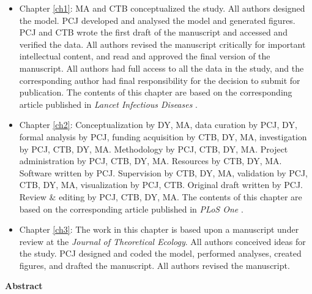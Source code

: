   \begin{itemize}
    
   \item Chapter \ref{ch1}: MA and CTB conceptualized the study. All authors designed the model. PCJ developed and analysed the model and generated figures. PCJ and CTB wrote the first draft of the manuscript and accessed and verified the data. All authors revised the manuscript critically for important intellectual content, and read and approved the final version of the manuscript. All authors had full access to all the data in the study, and the corresponding author had final responsibility for the decision to submit for publication. The contents of this chapter are based on the corresponding article published in \textit{Lancet Infectious Diseases} \cite{jentsch2021prioritising}.
   
   \item Chapter \ref{ch2}: Conceptualization by DY, MA, data curation by PCJ, DY, formal analysis by PCJ, funding acquisition by CTB, DY, MA, investigation by PCJ, CTB, DY, MA. Methodology by PCJ, CTB, DY, MA. Project administration by PCJ, CTB, DY, MA. Resources by CTB, DY, MA. Software written by PCJ. Supervision by CTB, DY, MA, validation by PCJ, CTB, DY, MA, visualization by PCJ, CTB. Original draft written by PCJ. Review & editing by PCJ, CTB, DY, MA. The contents of this chapter are based on the corresponding article published in \textit{PLoS One} \cite{jentsch2020go}.

   
   \item Chapter \ref{ch3}: The work in this chapter is based upon a manuscript under review at the \textit{Journal of Theoretical Ecology}. All authors conceived ideas for the study. PCJ designed and coded the model, performed
   analyses, created figures, and drafted the manuscript. All authors revised the manuscript.
   

  \end{itemize}
 \cleardoublepage
 

\begin{center}\textbf{Abstract}\end{center}


